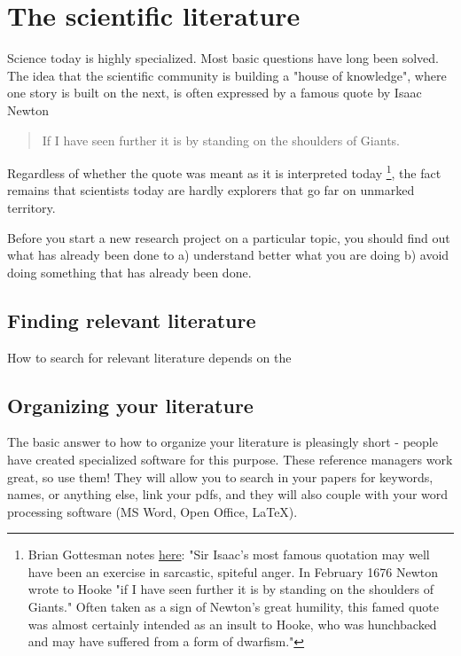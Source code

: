 \documentclass{tufte-book}
\begin{document}
\chapter{The scientific literature}

Science today is highly specialized. Most basic questions have long been solved. The idea that the scientific community is building a "house of knowledge", where one story is built on the next, is often expressed by a famous quote by Isaac Newton 

\begin{quote}
If I have seen further it is by standing on the shoulders of Giants.
\end{quote}

Regardless of whether the quote was meant as it is interpreted today \footnote{Brian Gottesman notes \href{http://mentalfloss.com/article/24520/6-things-you-should-know-about-isaac-newton}{here}: "Sir Isaac's most famous quotation may well have been an exercise in sarcastic, spiteful anger. In February 1676 Newton wrote to Hooke "if I have seen further it is by standing on the shoulders of Giants." Often taken as a sign of Newton's great humility, this famed quote was almost certainly intended as an insult to Hooke, who was hunchbacked and may have suffered from a form of dwarfism."
}, the fact remains that scientists today are hardly explorers that go far on unmarked territory. 


 





Before you start a new research project on a particular topic, you should find out what has already been done to a) understand better what you are doing b) avoid doing something that has already been done. 


\section{Finding relevant literature}

How to search for relevant literature depends on the


\section{Organizing your literature}

The basic answer to how to organize your literature is pleasingly short - people have created specialized software for this purpose. These reference managers work great, so use them! They will allow you to search in your papers for keywords, names, or anything else, link your pdfs, and they will also couple with your word processing software (MS Word, Open Office, LaTeX). 
\end{document}
